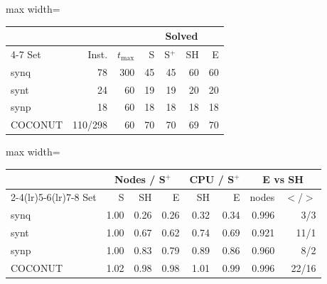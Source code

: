 \begin{adjustbox}{max width=\linewidth}\begin{tabular}{lrrrrrr}
\toprule
 & & & \multicolumn{4}{c}{Solved} \\
\cmidrule(lr){4-7}
Set & Inst. & $t_{\max}$ & S & S$^+$ & SH & E \\
\midrule
synq & 78 & 300 & 45 & 45 & 60 & 60 \\
synt & 24 & 60 & 19 & 19 & 20 & 20 \\
synp & 18 & 60 & 18 & 18 & 18 & 18 \\
COCONUT & 110/298 & 60 & 70 & 70 & 69 & 70 \\
\bottomrule
\end{tabular}\end{adjustbox}

\medskip
\begin{adjustbox}{max width=\linewidth}\begin{tabular}{lrrrrrrr}
\toprule
 & \multicolumn{3}{c}{Nodes / S$^+$} & \multicolumn{2}{c}{CPU / S$^+$} & \multicolumn{2}{c}{E vs SH} \\
\cmidrule(lr){2-4}\cmidrule(lr){5-6}\cmidrule(lr){7-8}
Set & S & SH & E & SH & E & nodes & $<$/$>$ \\
\midrule
synq & 1.00 & 0.26 & 0.26 & 0.32 & 0.34 & 0.996 & 3/3 \\
synt & 1.00 & 0.67 & 0.62 & 0.74 & 0.69 & 0.921 & 11/1 \\
synp & 1.00 & 0.83 & 0.79 & 0.89 & 0.86 & 0.960 & 8/2 \\
COCONUT & 1.02 & 0.98 & 0.98 & 1.01 & 0.99 & 0.996 & 22/16 \\
\bottomrule
\end{tabular}\end{adjustbox}
